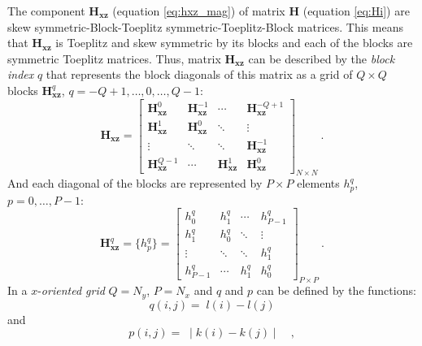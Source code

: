 The component $\mathbf{H_{xz}}$ (equation \ref{eq:hxz_mag}) of matrix $\mathbf{H}$ (equation \ref{eq:Hi}) are skew symmetric-Block-Toeplitz symmetric-Toeplitz-Block matrices. This means that $\mathbf{H_{xz}}$ is Toeplitz and skew symmetric by its blocks and each of the blocks are symmetric Toeplitz matrices. 
Thus, matrix $\mathbf{H_{xz}}$ can be described by the \textit{block index} $q$ that represents the block diagonals of this matrix as a grid of $Q \times Q$ blocks $\mathbf{H}^{q}_\mathbf{xz}$, $q = -Q + 1, \dots, 0, \dots, Q - 1$:
\begin{equation}
	\mathbf{H_{xz}} = \begin{bmatrix}
		\mathbf{H}^{0}_\mathbf{xz}  & \mathbf{H}^{-1}_\mathbf{xz} & \cdots         & \mathbf{H}^{-Q+1}_\mathbf{xz} \\
		\mathbf{H}^{1}_\mathbf{xz}  & \mathbf{H}^{0}_\mathbf{xz} & \ddots         & \vdots           \\ 
		\vdots           & \ddots         & \ddots         & \mathbf{H}^{-1}_\mathbf{xz}   \\
		\mathbf{H}^{Q-1}_\mathbf{xz} & \cdots         & \mathbf{H}^{1}_\mathbf{xz} & \mathbf{H}^{0}_\mathbf{xz}                
	\end{bmatrix}_{N \times N} \: .
	\label{eq:BTTB_Hxz}
\end{equation}
And each diagonal of the blocks are represented by $P \times P$ elements $h^{q}_{p}$, $p = 0, \dots, P - 1$:
\begin{equation}
	\mathbf{H}^{q}_\mathbf{xz} =  \{h^{q}_p\} = \begin{bmatrix}
		h^{q}_{0}   & h^{q}_{1} & \cdots    & h^{q}_{P-1} \\
		h^{q}_{1}   & h^{q}_{0} & \ddots    & \vdots           \\ 
		\vdots      & \ddots    & \ddots    & h^{q}_{1}   \\
		h^{q}_{P-1} & \cdots    & h^{q}_{1} & h^{q}_{0}                 
	\end{bmatrix}_{P \times P} \: .
	\label{eq:Hxz_block}
\end{equation}
In a $x$-\textit{oriented grid} $Q = N_{y}$, $P = N_{x}$ and $q$ and $p$ can be defined by the functions:
\begin{equation}
	q(i, j) = \; l(i) - l(j) 
	\label{eq:Hxz-q-x-oriented}
\end{equation}
and
\begin{equation}
	p(i, j) = \; \mid k(i) - k(j) \mid \quad ,
	\label{eq:Hxz-p-x-oriented}
\end{equation}
